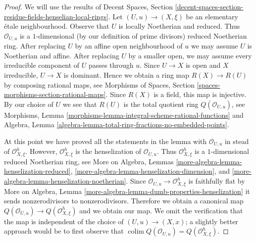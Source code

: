 \documentclass[10pt,a4paper]{amsart}
\theoremstyle{plain}
\theoremstyle{definition}
\theoremstyle{remark}
\numberwithin{equation}{subsection}
\def\colim{\mathop{\mathrm{colim}}\nolimits}
\begin{document}
\begin{proof}
We will use the results of Decent Spaces, Section
\ref{decent-spaces-section-residue-fields-henselian-local-rings}.
Let $(U, u) \to (X, \xi)$ be an elementary \'etale neighbourhood.
Observe that $U$ is locally Noetherian and reduced.
Thus $\mathcal{O}_{U, u}$ is a $1$-dimensional
(by our definition of prime divisors)
reduced Noetherian ring.
After replacing $U$ by an affine open neighbourhood of $u$
we may assume $U$ is Noetherian and affine.
After replacing $U$ by a smaller open, we may assume every irreducible
component of $U$ passes through $u$.
Since $U \to X$ is open and $X$ irreducible, $U \to X$ is dominant.
Hence we obtain a ring map $R(X) \to R(U)$ by composing rational maps, see
Morphisms of Spaces, Section \ref{spaces-morphisms-section-rational-maps}.
Since $R(X)$ is a field, this map is injective.
By our choice of $U$ we see that $R(U)$ is the total quotient
ring $Q(\mathcal{O}_{U, u})$, see
Morphisms, Lemma \ref{morphisms-lemma-integral-scheme-rational-functions}
and
Algebra, Lemma \ref{algebra-lemma-total-ring-fractions-no-embedded-points}.

\medskip\noindent
At this point we have proved all the statements in the lemma with
$\mathcal{O}_{U, u}$ in stead of $\mathcal{O}_{X, \xi}^h$.
However, $\mathcal{O}_{X, \xi}^h$ is the henselization of
$\mathcal{O}_{U, u}$. Thus $\mathcal{O}_{X, \xi}^h$ is a $1$-dimensional
reduced Noetherian ring, see
More on Algebra, Lemmas
\ref{more-algebra-lemma-henselization-reduced},
\ref{more-algebra-lemma-henselization-dimension}, and
\ref{more-algebra-lemma-henselization-noetherian}.
Since $\mathcal{O}_{U, u} \to \mathcal{O}_{X, \xi}^h$ is
faithfully flat by More on Algebra, Lemma
\ref{more-algebra-lemma-dumb-properties-henselization}
it sends nonzerodivisors to nonzerodivisors.
Therefore we obtain a canonical map
$Q(\mathcal{O}_{U, u}) \to Q(\mathcal{O}_{X, \xi}^h)$
and we obtain our map.
We omit the verification that the map is independent of
the choice of $(U, u) \to (X, x)$; a slightly better
approach would be to first observe that
$\colim Q(\mathcal{O}_{U, u}) = Q(\mathcal{O}_{X, \xi}^h)$.
\end{proof}
\end{document}
